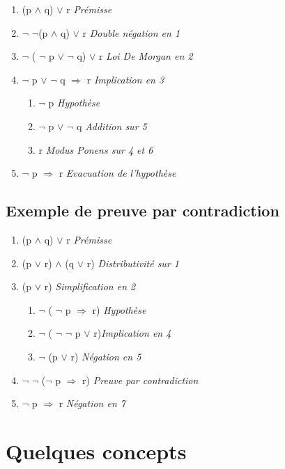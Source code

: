 \begin{enumerate}
\item (p $\land$ q) $\lor$ r  \textit{Prémisse}
\item $\lnot$ $\lnot$(p $\land$ q) $\lor$ r \textit{Double négation en 1}
\item $\lnot$ ( $\lnot$ p $\lor$ $\lnot$ q) $\lor$ r \textit{Loi De Morgan en 2}
\item $\lnot$ p $\lor$ $\lnot$ q $\Rightarrow$ r \textit{Implication en 3}

\begin{enumerate}
 \item  $\lnot$ p \textit{Hypothèse}
 \item  $\lnot$ p $\lor$ $\lnot$ q \textit{ Addition sur 5}
 \item  r \textit{ Modus Ponens sur 4 et 6}
\end{enumerate}

\item  $\lnot$ p $\Rightarrow$ r \textit{Evacuation de l'hypothèse}
\end{enumerate}

\subsection{Exemple de preuve par contradiction}

\begin{enumerate}
\item  (p $\land$ q) $\lor$ r  \textit{Prémisse}
\item  (p  $\lor$ r) $\land$ (q $\lor$ r) \textit{Distributivité sur 1}
\item  (p $\lor$ r)  \textit{Simplification en 2}

\begin{enumerate}
 \item $\lnot$ ( $\lnot$ p $\Rightarrow$ r)  \textit{Hypothèse}
 \item $\lnot$ ( $\lnot$ $\lnot$ p $\lor$ r)\textit{Implication en 4}
 \item $\lnot$ (p $\lor$ r) \textit{ Négation en 5}
\end{enumerate}

\item $\lnot$ $\lnot$ ($\lnot$ p $\Rightarrow$ r)  \textit{ Preuve par contradiction}
\item $\lnot$ p $\Rightarrow$ r \textit{Négation en 7}
\end{enumerate}


\section{Quelques concepts}
